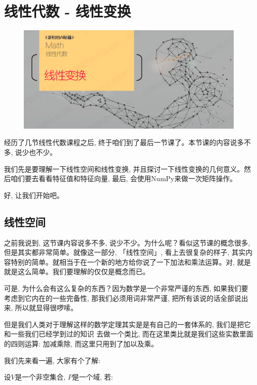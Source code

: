 \chapter{线性代数 - 线性变换}

\begin{figure}[ht]
  \centering
  \includegraphics[width=1\linewidth]{asset/茶桁的AI秘籍_Math_18.png}
\end{figure}

\newpage

经历了几节线性代数课程之后, 终于咱们到了最后一节课了。本节课的内容说多不多, 说少也不少。

我们先是要理解一下线性空间和线性变换, 并且探讨一下线性变换的几何意义。然后咱们要去看看特征值和特征向量, 最后, 会使用NumPy来做一次矩阵操作。

好, 让我们开始吧。

\section{线性空间}

之前我说到, 这节课内容说多不多, 说少不少。为什么呢？看似这节课的概念很多, 但是其实都非常简单。就像这一部分, 「线性空间」,  看上去很复杂的样子, 其实内容特别的简单。就相当于在一个新的地方给你说了一下加法和乘法运算。对, 就是就是这么简单。我们要理解的仅仅是概念而已。

可是, 为什么会有这么复杂的东西？因为数学是一个非常严谨的东西, 如果我们要考虑到它内在的一些完备性, 那我们必须用词非常严谨, 把所有该说的话全部说出来, 所以就显得很啰嗦。

但是我们人类对于理解这样的数学定理其实是是有自己的一套体系的, 我们是把它和一些我们已经学到过的知识
去做一个类比, 而在这里类比就是我们这些实数里面的四则运算: 加减乘除, 而这里只用到了加以及乘。


我们先来看一遍, 大家有个了解: 

设$V$是一个非空集合, $P$是一个域, 若: 

